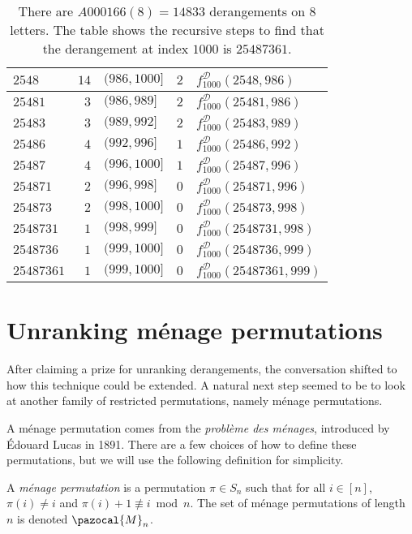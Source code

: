 \begin{table}
\begin{tabular}{|l|r|l|c|l|}
  $2548    $ & $14$   & $(986, 1000]$     & $2$ & $f^{\mathcal{D}}_{1000}(2548, 986)$     \\
  \hline
  $25481   $ & $3$    & $(986, 989]$      & $2$ & $f^{\mathcal{D}}_{1000}(25481, 986)$    \\
  $25483   $ & $3$    & $(989, 992]$      & $2$ & $f^{\mathcal{D}}_{1000}(25483, 989)$    \\
  $25486   $ & $4$    & $(992, 996]$      & $1$ & $f^{\mathcal{D}}_{1000}(25486, 992)$    \\
  $25487   $ & $4$    & $(996, 1000]$     & $1$ & $f^{\mathcal{D}}_{1000}(25487, 996)$    \\
  \hline
  $254871   $ & $2$   & $(996, 998]$      & $0$ & $f^{\mathcal{D}}_{1000}(254871, 996)$   \\
  $254873   $ & $2$   & $(998, 1000]$     & $0$ & $f^{\mathcal{D}}_{1000}(254873, 998)$   \\
  \hline
  $2548731  $ & $1$   & $(998, 999]$      & $0$ & $f^{\mathcal{D}}_{1000}(2548731, 998)$  \\
  $2548736  $ & $1$   & $(999, 1000]$     & $0$ & $f^{\mathcal{D}}_{1000}(2548736, 999)$  \\
  \hline
  $25487361 $ & $1$   & $(999, 1000]$     & $0$ & $f^{\mathcal{D}}_{1000}(25487361, 999)$ \\
  \hline
\end{tabular}
\caption[Steps for computing the $1000$th derangement in $S_8$]{
  There are $A000166(8) = 14833$ derangements on $8$ letters.
  The table shows the recursive steps to find that the derangement at index
  $1000$ is $25487361$.
}
\label{table:unrankDerangement}
\end{table}

\section{Unranking m\'enage permutations}
\label{sec:unrankingMenage}
After claiming a prize for unranking derangements, the conversation shifted to
how this technique could be extended. A natural next step seemed to be to look
at another family of restricted permutations, namely m\'enage permutations.

A m\'enage permutation comes from the \textit{probl\`eme des m\'enages},
introduced by \'Edouard Lucas in 1891.
There are a few choices of how to define these permutations, but we will
use the following definition for simplicity.
\begin{definition}
  A \textit{m\'enage permutation} is a permutation $\pi \in S_n$ such that for
  all $i \in [n]$,
  $\pi(i) \neq i$ and
  $\pi(i) + 1 \not\equiv i \bmod n$.
  The set of m\'enage permutations of length $n$ is denoted $\pazocal{M}_n$.
\end{definition}

